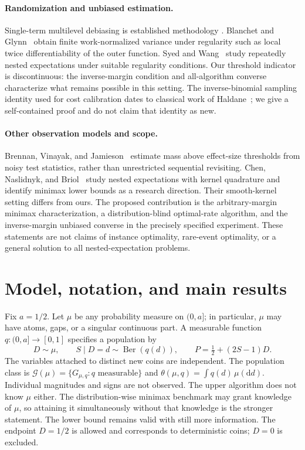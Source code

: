 \documentclass[11pt,a4paper]{article}
\theoremstyle{definition}
\newcommand{\Ber}{\operatorname{Ber}}
\newcommand{\cG}{\mathcal G}
\begin{document}
\paragraph{Randomization and unbiased estimation.}
Single-term multilevel debiasing is established methodology
\cite{rheeglynn,vihola}. Blanchet and Glynn~\cite{blanchetglynn} obtain
finite work-normalized variance under regularity such as local twice
differentiability of the outer function. Syed and Wang~\cite{syedwang}
study repeatedly nested expectations under suitable regularity conditions.
Our threshold indicator is discontinuous: the inverse-margin condition and
all-algorithm converse characterize what remains possible in this setting.
The inverse-binomial sampling identity used for cost calibration dates to
classical work of Haldane~\cite{haldane}; we give a self-contained proof and
do not claim that identity as new.

\paragraph{Other observation models and scope.}
Brennan, Vinayak, and Jamieson~\cite{brennan} estimate mass above effect-size
thresholds from noisy test statistics, rather than unrestricted sequential
revisiting. Chen, Naslidnyk, and Briol~\cite{chen} study nested expectations
with kernel quadrature and identify minimax lower bounds as a research
direction. Their smooth-kernel setting differs from ours.
The proposed contribution is the arbitrary-margin minimax characterization,
a distribution-blind optimal-rate algorithm, and the inverse-margin unbiased
converse in the precisely specified experiment. These statements are not
claims of instance optimality, rare-event optimality, or a general solution
to all nested-expectation problems.

\section{Model, notation, and main results}\label{sec:model}
Fix $a=1/2$. Let $\mu$ be any probability measure on $(0,a]$; in particular,
$\mu$ may have atoms, gaps, or a singular continuous part. A measurable
function $q:(0,a]\to[0,1]$ specifies a population by
\begin{equation}\label{eq:model}
 D\sim\mu,\qquad S\mid D=d\sim\Ber(q(d)),\qquad
 P=\tfrac12+(2S-1)D.
\end{equation}
The variables attached to distinct new coins are independent. The
population class is $\cG(\mu)=\{G_{\mu,q}:q\text{ measurable}\}$ and
$\theta(\mu,q)=\int q(d)\,\mu(\mathrm d d)$.
Individual magnitudes and signs are not observed. The upper algorithm does
not know $\mu$ either. The distribution-wise minimax benchmark may grant
knowledge of $\mu$, so attaining it simultaneously without that knowledge
is the stronger statement. The lower bound remains valid with still more
information. The endpoint $D=1/2$ is allowed and corresponds to deterministic
coins; $D=0$ is excluded.
\end{document}
